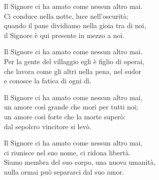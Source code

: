 
\strofa Il Signore ci ha amato come nessun altro mai.\\
Ci conduce nella notte, luce nell'oscurità;\\
quando il pane dividiamo nella gioia tra di noi,\\
il Signore è qui presente in mezzo a noi.

\spazio


\spazio

\strofa Il Signore ci ha amato come nessun altro mai.\\
Per la gente del villaggio egli è figlio di operai,\\
che lavora come gli altri nella pena, nel sudor\\
e conosce la fatica di ogni dì.

\spazio


\spazio

\strofa Il Signore ci ha amato come nessun altro mai,\\
un amore così grande che morì per tutti noi;\\
un amore così forte che la morte superò:\\
dal sepolcro vincitore si levò.

\spazio


\spazio

\strofa Il Signore ci ha amato come nessun altro mai,\\
ci riunisce nel suo nome, ci ridona libertà.\\
Siamo membra del suo corpo, una nuova umanità,\\
nulla ormai può separarci dal suo amor.

\spazio

